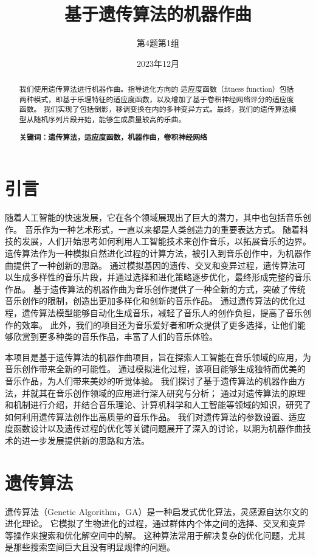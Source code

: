 \documentclass{article}
\title{基于遗传算法的机器作曲}
\author{第4题第1组}
\date{2023年12月}
\begin{document}
\maketitle

\begin{abstract}
我们使用遗传算法进行机器作曲。指导进化方向的
适应度函数（fitness function）包括两种模式，即基于乐理特征的适应度函数，以及增加了基于卷积神经网络评分的适应度函数。
我们实现了包括倒影，移调变换在内的多种变异方式。最终，我们的遗传算法模型从随机序列片段开始，能够生成质量较高的乐曲。

\begin{center}
    \textbf{关键词：遗传算法，适应度函数，机器作曲，卷积神经网络}
\end{center}
\end{abstract}

\section{引言}
随着人工智能的快速发展，它在各个领域展现出了巨大的潜力，其中也包括音乐创作。
音乐作为一种艺术形式，一直以来都是人类创造力的重要表达方式。
随着科技的发展，人们开始思考如何利用人工智能技术来创作音乐，以拓展音乐的边界。
遗传算法作为一种模拟自然进化过程的计算方法，被引入到音乐创作中，为机器作曲提供了一种创新的思路。
通过模拟基因的遗传、交叉和变异过程，遗传算法可以生成多样性的音乐片段，并通过选择和进化策略逐步优化，最终形成完整的音乐作品。
基于遗传算法的机器作曲为音乐创作提供了一种全新的方式，突破了传统音乐创作的限制，创造出更加多样化和创新的音乐作品。
通过遗传算法的优化过程，遗传算法模型能够自动化生成音乐，减轻了音乐人的创作负担，提高了音乐创作的效率。
此外，我们的项目还为音乐爱好者和听众提供了更多选择，让他们能够欣赏到更多种类的音乐作品，丰富了人们的音乐体验。

本项目是基于遗传算法的机器作曲项目，旨在探索人工智能在音乐领域的应用，为音乐创作带来全新的可能性。
通过模拟进化过程，该项目能够生成独特而优美的音乐作品，为人们带来美妙的听觉体验。
我们探讨了基于遗传算法的机器作曲方法，并就其在音乐创作领域的应用进行深入研究与分析；
通过对遗传算法的原理和机制进行介绍，并结合音乐理论、计算机科学和人工智能等领域的知识，研究了如何利用遗传算法创作出高质量的音乐作品。
我们对遗传算法的参数设置、适应度函数设计以及遗传过程的优化等关键问题展开了深入的讨论，以期为机器作曲技术的进一步发展提供新的思路和方法。

\section{遗传算法}
遗传算法（Genetic Algorithm，GA）是一种启发式优化算法，灵感源自达尔文的进化理论。
它模拟了生物进化的过程，通过群体内个体之间的选择、交叉和变异等操作来搜索和优化解空间中的解。
这种算法常用于解决复杂的优化问题，尤其是那些搜索空间巨大且没有明显规律的问题。
\end{document}
